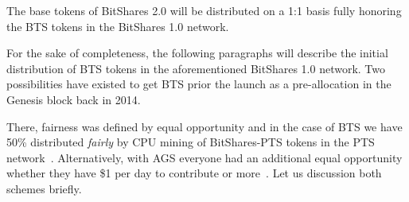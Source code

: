 The base tokens of BitShares 2.0 will be distributed on a 1:1 basis fully
honoring the BTS tokens in the BitShares 1.0 network.

For the sake of completeness, the following paragraphs will describe the
initial distribution of BTS tokens in the aforementioned BitShares 1.0 network.
Two possibilities have existed to get BTS prior the launch as a pre-allocation
in the Genesis block back in 2014.

There, fairness was defined by equal opportunity and in the case of BTS we have
50\% distributed \emph{fairly} by CPU mining of BitShares-PTS tokens in the PTS
network~\cite{}. Alternatively, with AGS everyone had an additional equal
opportunity whether they have \$1 per day to contribute or more~\cite{}. Let us
discussion both schemes briefly.
